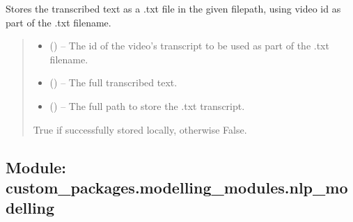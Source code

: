 \documentclass[letterpaper,10pt,english]{sphinxhowto}
\begin{document}
\begin{fulllineitems}
\label{\detokenize{_autosummary/custom_packages.preprocessing_modules.transcriber.store_transcript:custom_packages.preprocessing_modules.transcriber.store_transcript}}
\pysigstartsignatures
\pysiglinewithargsret
{}
{\sphinxparamcomma {}\sphinxparamcomma {}}
{}
\pysigstopsignatures
\sphinxAtStartPar
Stores the transcribed text as a .txt file in the given filepath, using video id as part of the .txt filename.
\begin{quote}\begin{description}
\begin{itemize}
\item {} 
\sphinxAtStartPar
{} () – The id of the video’s transcript to be used as part of the .txt filename.

\item {} 
\sphinxAtStartPar
{} () – The full transcribed text.

\item {} 
\sphinxAtStartPar
{} () – The full path to store the .txt transcript.

\end{itemize}

\sphinxAtStartPar
True if successfully stored locally, otherwise False.

\sphinxAtStartPar
{}

\end{description}\end{quote}

\end{fulllineitems}


\sphinxstepscope


\subsection{Module: custom\_packages.modelling\_modules.nlp\_modelling}
\label{\detokenize{modelling_modules:module-custom-packages-modelling-modules-nlp-modelling}}\label{\detokenize{modelling_modules::doc}}
\end{document}
